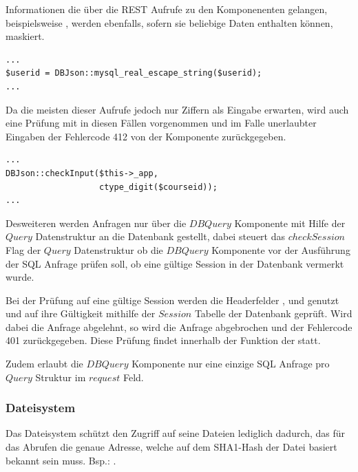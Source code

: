 Informationen die über die REST Aufrufe zu den Komponenenten gelangen, beispielsweise , werden ebenfalls, sofern sie beliebige Daten enthalten können, maskiert. 

\begin{minipage}{\textwidth}
\begin{lstlisting}
...
$userid = DBJson::mysql_real_escape_string($userid);
...
\end{lstlisting}
\end{minipage}

Da die meisten dieser Aufrufe jedoch nur Ziffern als Eingabe erwarten, wird auch eine Prüfung mit  in diesen Fällen vorgenommen und im Falle unerlaubter Eingaben der Fehlercode 412 von der Komponente zurückgegeben.

\begin{minipage}{\textwidth}
\begin{lstlisting}
...
DBJson::checkInput($this->_app, 
                   ctype_digit($courseid));
...
\end{lstlisting}
\end{minipage}

Desweiteren werden Anfragen nur über die $DBQuery$ Komponente mit Hilfe der $Query$ Datenstruktur an die Datenbank gestellt, dabei steuert das $checkSession$ Flag der $Query$ Datenstruktur ob die $DBQuery$ Komponente vor der Ausführung der SQL Anfrage prüfen soll, ob eine gültige Session in der Datenbank vermerkt wurde. 

Bei der Prüfung auf eine gültige Session werden die Headerfelder ,  und  genutzt und auf ihre Gültigkeit mithilfe der $Session$ Tabelle der Datenbank geprüft. Wird dabei die Anfrage abgelehnt, so wird die Anfrage abgebrochen und der Fehlercode 401 zurückgegeben. Diese Prüfung findet innerhalb der  Funktion der  statt.

Zudem erlaubt die $DBQuery$ Komponente nur eine einzige SQL Anfrage pro $Query$ Struktur im $request$ Feld.

\subsubsection{Dateisystem}
Das Dateisystem schützt den Zugriff auf seine Dateien lediglich dadurch, das für das Abrufen die genaue Adresse, welche auf dem SHA1-Hash der Datei basiert bekannt sein muss.
Bsp.: .

